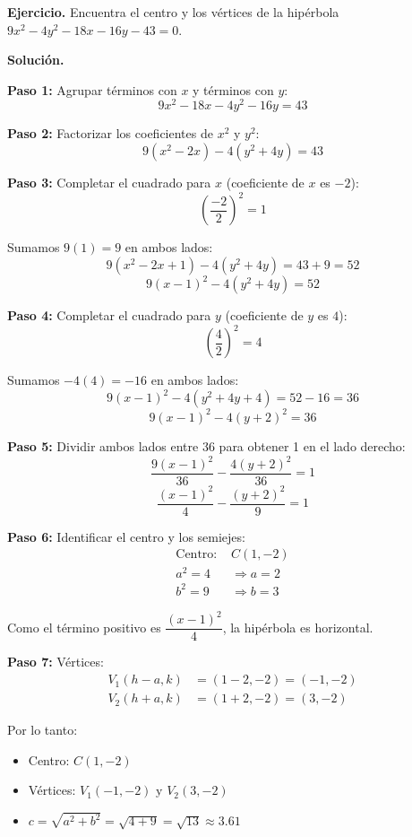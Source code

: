 \documentclass[12pt,a4paper]{article}
\begin{document}
	\textbf{Ejercicio.} Encuentra el centro y los vértices de la hipérbola $9x^2-4y^2-18x-16y-43=0$.

	\bigskip

	\textbf{Solución.}

	\bigskip

	\textbf{Paso 1:} Agrupar términos con $x$ y términos con $y$:
	\[
	9x^2-18x-4y^2-16y=43
	\]

	\textbf{Paso 2:} Factorizar los coeficientes de $x^2$ y $y^2$:
	\[
	9(x^2-2x)-4(y^2+4y)=43
	\]

	\textbf{Paso 3:} Completar el cuadrado para $x$ (coeficiente de $x$ es $-2$):
	\[
	\left(\frac{-2}{2}\right)^2=1
	\]

	Sumamos $9(1)=9$ en ambos lados:
	\[
	9(x^2-2x+1)-4(y^2+4y)=43+9=52
	\]
	\[
	9(x-1)^2-4(y^2+4y)=52
	\]

	\textbf{Paso 4:} Completar el cuadrado para $y$ (coeficiente de $y$ es $4$):
	\[
	\left(\frac{4}{2}\right)^2=4
	\]

	Sumamos $-4(4)=-16$ en ambos lados:
	\[
	9(x-1)^2-4(y^2+4y+4)=52-16=36
	\]
	\[
	9(x-1)^2-4(y+2)^2=36
	\]

	\textbf{Paso 5:} Dividir ambos lados entre 36 para obtener 1 en el lado derecho:
	\[
	\frac{9(x-1)^2}{36}-\frac{4(y+2)^2}{36}=1
	\]
	\[
	\frac{(x-1)^2}{4}-\frac{(y+2)^2}{9}=1
	\]

	\textbf{Paso 6:} Identificar el centro y los semiejes:
	\[
	\begin{aligned}
		\text{Centro: }&C(1,-2)\\
		a^2=4&\Rightarrow a=2\\
		b^2=9&\Rightarrow b=3
	\end{aligned}
	\]

	Como el término positivo es $\dfrac{(x-1)^2}{4}$, la hipérbola es horizontal.

	\textbf{Paso 7:} Vértices:
	\[
	\begin{aligned}
		V_1(h-a,k)&=(1-2,-2)=(-1,-2)\\
		V_2(h+a,k)&=(1+2,-2)=(3,-2)
	\end{aligned}
	\]

	Por lo tanto:
	\begin{itemize}
		\item Centro: $\boxed{C(1,-2)}$
		\item Vértices: $\boxed{V_1(-1,-2)\text{ y }V_2(3,-2)}$
		\item $c=\sqrt{a^2+b^2}=\sqrt{4+9}=\sqrt{13}\approx 3.61$
	\end{itemize}
\end{document}
